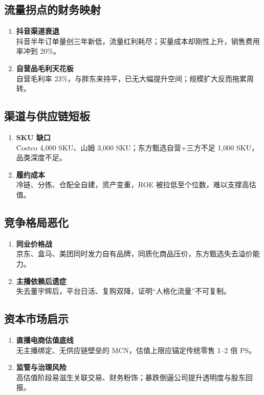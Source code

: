 \subsection{流量拐点的财务映射}
\begin{enumerate}[leftmargin=*, nosep]
    \item \textbf{抖音渠道衰退}  \\
    抖音半年订单量创三年新低，流量红利耗尽；买量成本却刚性上升，销售费用率冲到 20\%。
    \item \textbf{自营品毛利天花板}  \\
    自营毛利率 23\%，与胖东来持平，已无大幅提升空间；规模扩大反而拖累周转。
\end{enumerate}

\subsection{渠道与供应链短板}
\begin{enumerate}[leftmargin=*, nosep]
    \item \textbf{SKU 缺口}  \\
    Costco 4,000 SKU、山姆 3,000 SKU；东方甄选自营+三方不足 1,000 SKU，品类深度不足。
    \item \textbf{履约成本}  \\
    冷链、分拣、仓配全自建，资产变重，ROE 被拉低至个位数，难以支撑高估值。
\end{enumerate}

\subsection{竞争格局恶化}
\begin{enumerate}[leftmargin=*, nosep]
    \item \textbf{同业价格战}  \\
    京东、盒马、美团同时发力自有品牌，同质化商品压价，东方甄选失去溢价能力。
    \item \textbf{主播依赖后遗症}  \\
    失去董宇辉后，平台日活、复购双降，证明{\color{red}“人格化流量”不可复制}。
\end{enumerate}

\subsection{资本市场启示}
\begin{enumerate}[leftmargin=*, nosep]
    \item \textbf{直播电商估值底线}  \\
    无主播绑定、无供应链壁垒的 MCN，估值上限应锚定传统零售 1–2 倍 PS。
    \item \textbf{监管与治理风险}  \\
    {\color{red}高估值阶段易滋生关联交易、财务粉饰；暴跌倒逼公司提升透明度与股东回报}。
\end{enumerate}

